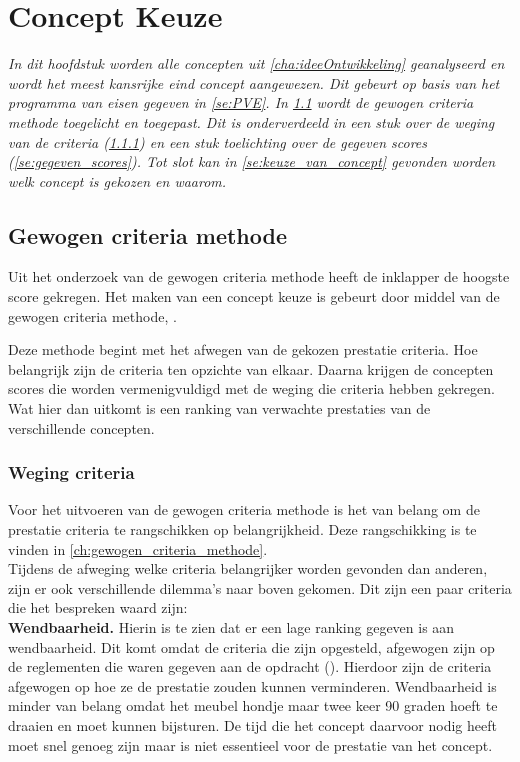 \chapter{Concept Keuze}
\label{cha:Concept_keuze}

\textit{ In dit hoofdstuk worden alle concepten uit \cref{cha:ideeOntwikkeling} geanalyseerd en wordt het meest kansrijke eind concept aangewezen. Dit gebeurt op basis van het programma van eisen gegeven in \cref{se:PVE}. In \cref{se:Gewogen_criteria_methode} wordt de gewogen criteria methode toegelicht en toegepast. Dit is onderverdeeld in een stuk over de weging van de criteria (\cref{se:weging_criteria}) en een stuk toelichting over de gegeven scores (\cref{se:gegeven_scores}). Tot slot kan in \cref{se:keuze_van_concept} gevonden worden welk concept is gekozen en waarom.}

\section{Gewogen criteria methode}
\label{se:Gewogen_criteria_methode}
Uit het onderzoek van de gewogen criteria methode heeft de inklapper de hoogste score gekregen. Het maken van een concept keuze is gebeurt door middel van de gewogen criteria methode, \cite{hanus_hagger_proffitt_barnes}.

Deze methode begint met het afwegen van de gekozen prestatie criteria. Hoe belangrijk zijn de criteria ten opzichte van elkaar. Daarna krijgen de concepten scores die worden vermenigvuldigd met de weging die criteria hebben gekregen. Wat hier dan uitkomt is een ranking van verwachte prestaties van de verschillende concepten.\\


\subsection{Weging criteria}
\label{se:weging_criteria}
Voor het uitvoeren van de gewogen criteria methode is het van belang om de prestatie criteria te rangschikken op belangrijkheid. Deze rangschikking is te vinden in \cref{ch:gewogen_criteria_methode}. \\
Tijdens de afweging welke criteria belangrijker worden gevonden dan anderen, zijn er ook verschillende dilemma's naar boven gekomen. Dit zijn een paar criteria die het bespreken waard zijn:  \\

\vspace{\baselineskip}
\textbf{Wendbaarheid.} Hierin is te zien dat er een lage ranking gegeven is aan wendbaarheid. Dit komt omdat de criteria die zijn opgesteld, afgewogen zijn op de reglementen die waren gegeven aan de opdracht (\cite{beek_2020_wedstrijdregelement}). Hierdoor zijn de criteria afgewogen op hoe ze de prestatie zouden kunnen verminderen. Wendbaarheid is minder van belang omdat het meubel hondje maar twee keer 90 graden hoeft te draaien en moet kunnen bijsturen. De tijd die het concept daarvoor nodig heeft moet snel genoeg zijn maar is niet essentieel voor de prestatie van het concept.\\
\vspace{\baselineskip}

